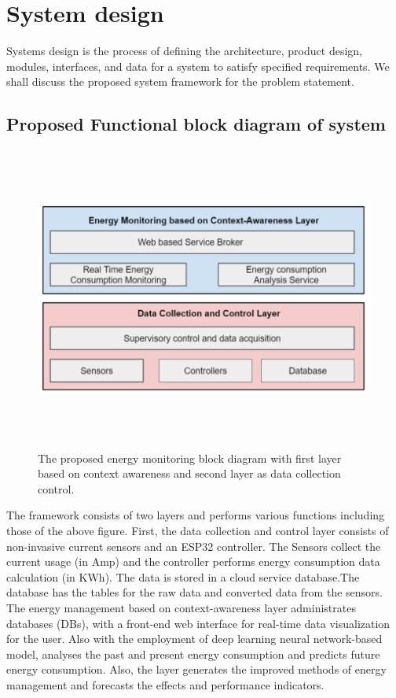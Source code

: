 \documentclass[12 pt]{report}
\begin{document}
 \section{System design}
 \item 

Systems design is the process of defining the architecture, product design, modules, interfaces, and data for a system to satisfy specified requirements. We shall discuss the proposed system framework for the problem statement.
\subsection{Proposed Functional block diagram of system}
\begin{figure}[h!]
\centering
\includegraphics[width=16cm,height = 10cm,frame]{images/problock.png}
\caption{The proposed energy monitoring block diagram with first layer based on context awareness and second layer as data collection control.}
\label{fig:Proposed Block Diagram of system}
\end{figure}
The framework consists of two layers and performs various functions including those of the above figure. First, the data collection and control layer consists of non-invasive current sensors and an ESP32 controller. The Sensors collect the current usage (in Amp) and the controller performs energy consumption data calculation (in KWh). The data is stored in a cloud service database.The database has the tables for the raw data and converted data from the sensors. The energy management based on context-awareness layer administrates databases (DBs), with a front-end web interface for real-time data visualization for the user. Also with the employment of deep learning neural network-based model, analyses the past and present energy consumption and predicts future energy consumption. Also, the layer generates the
improved methods of energy management and forecasts the effects and performance indicators.
\end{document}
